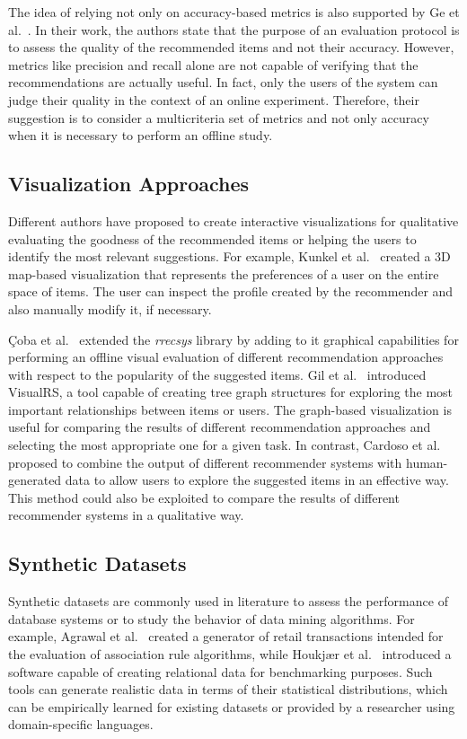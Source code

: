 The idea of relying not only on accuracy-based metrics is also supported by Ge et al.~\cite{Ge2010}. In their work, the authors state that the purpose of an evaluation protocol is to assess the quality of the recommended items and not their accuracy. However, metrics like precision and recall alone are not capable of verifying that the recommendations are actually useful. In fact, only the users of the system can judge their quality in the context of an online experiment. Therefore, their suggestion is to consider a multicriteria set of metrics and not only accuracy when it is necessary to perform an offline study.

\subsection{Visualization Approaches}

Different authors have proposed to create interactive visualizations for qualitative evaluating the goodness of the recommended items or helping the users to identify the most relevant suggestions. For example, Kunkel et al.~\cite{Kunkel2017} created a 3D map-based visualization that represents the preferences of a user on the entire space of items. The user can inspect the profile created by the recommender and also manually modify it, if necessary.

\c{C}oba et al.~\cite{Coba2017} extended the \textit{rrecsys} library by adding to it graphical capabilities for performing an offline visual evaluation of different recommendation approaches with respect to the popularity of the suggested items. Gil et al.~\cite{Gil2018} introduced VisualRS, a tool capable of creating tree graph structures for exploring the most important relationships between items or users. The graph-based visualization is useful for comparing the results of different recommendation approaches and selecting the most appropriate one for a given task. In contrast, Cardoso et al.~\cite{Cardoso2019} proposed to combine the output of different recommender systems with human-generated data to allow users to explore the suggested items in an effective way. This method could also be exploited to compare the results of different recommender systems in a qualitative way.

\subsection{Synthetic Datasets}

Synthetic datasets are commonly used in literature to assess the performance of database systems or to study the behavior of data mining algorithms. For example, Agrawal et al.~\cite{Agrawal1994} created a generator of retail transactions intended for the evaluation of association rule algorithms, while Houkj{\ae}r et al.~\cite{Houkjaer2006} introduced a software capable of creating relational data for benchmarking purposes. Such tools can generate realistic data in terms of their statistical distributions, which can be empirically learned for existing datasets or provided by a researcher using domain-specific languages.

